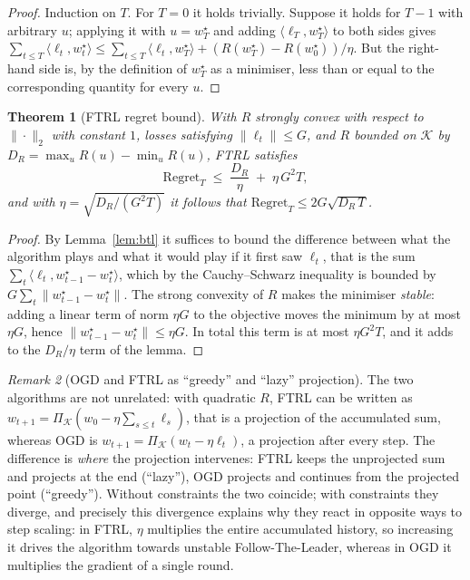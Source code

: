 \documentclass[12pt,a4paper,oneside]{report}
\renewcommand{\_}{\oldunderscore\allowbreak}
\theoremstyle{definition}
\theoremstyle{plain}
\newtheorem{theorem}{Theorem}[chapter]
\theoremstyle{remark}
\newtheorem{remark}[theorem]{Remark}
\begin{document}
\begin{proof}
Induction on $T$. For $T=0$ it holds trivially. Suppose it holds for $T-1$ with arbitrary $u$;
applying it with $u = w^{\star}_T$ and adding $\langle \ell_T, w^{\star}_T\rangle$ to both
sides gives
$\sum_{t\leq T}\langle \ell_t,w^{\star}_t\rangle \leq \sum_{t\leq T}\langle \ell_t,
w^{\star}_T\rangle + (R(w^{\star}_T)-R(w^{\star}_0))/\eta$. But the right-hand side is, by the
definition of $w^{\star}_T$ as a minimiser, less than or equal to the corresponding quantity
for every $u$.
\end{proof}

\begin{theorem}[FTRL regret bound]
\label{thm:ftrl}
With $R$ strongly convex with respect to $\|\cdot\|_2$ with constant $1$, losses satisfying
$\|\ell_t\|\leq G$, and $R$ bounded on $\mathcal{K}$ by $D_R = \max_u R(u) - \min_u R(u)$, FTRL
satisfies
\[
\mathrm{Regret}_T \;\leq\; \frac{D_R}{\eta} \;+\; \eta\, G^2 T,
\]
and with $\eta = \sqrt{D_R/(G^2T)}$ it follows that $\mathrm{Regret}_T \leq 2G\sqrt{D_R\, T}$.
\end{theorem}

\begin{proof}
By Lemma~\ref{lem:btl} it suffices to bound the difference between what the algorithm plays and
what it would play if it first saw $\ell_t$, that is the sum
$\sum_t \langle \ell_t, w^{\star}_{t-1} - w^{\star}_t\rangle$, which by the Cauchy--Schwarz
inequality is bounded by $G\sum_t \|w^{\star}_{t-1}-w^{\star}_t\|$. The strong convexity of $R$
makes the minimiser \emph{stable}: adding a linear term of norm $\eta G$ to the objective moves
the minimum by at most $\eta G$, hence $\|w^{\star}_{t-1}-w^{\star}_t\| \leq \eta G$. In total
this term is at most $\eta G^2 T$, and it adds to the $D_R/\eta$ term of the lemma.
\end{proof}

\begin{remark}[OGD and FTRL as ``greedy'' and ``lazy'' projection]
The two algorithms are not unrelated: with quadratic $R$, FTRL can be written as
$w_{t+1} = \Pi_{\mathcal{K}}(w_0 - \eta\sum_{s\leq t}\ell_s)$, that is a projection of the
accumulated sum, whereas OGD is $w_{t+1} = \Pi_{\mathcal{K}}(w_t - \eta\ell_t)$, a projection
after every step. The difference is \emph{where} the projection intervenes: FTRL keeps the
unprojected sum and projects at the end (``lazy''), OGD projects and continues from the
projected point (``greedy''). Without constraints the two coincide; with constraints they
diverge, and precisely this divergence explains why they react in opposite ways to step
scaling: in FTRL, $\eta$ multiplies the entire accumulated history, so increasing it drives the
algorithm towards unstable Follow-The-Leader, whereas in OGD it multiplies the gradient of a
single round.
\end{remark}
\end{document}
